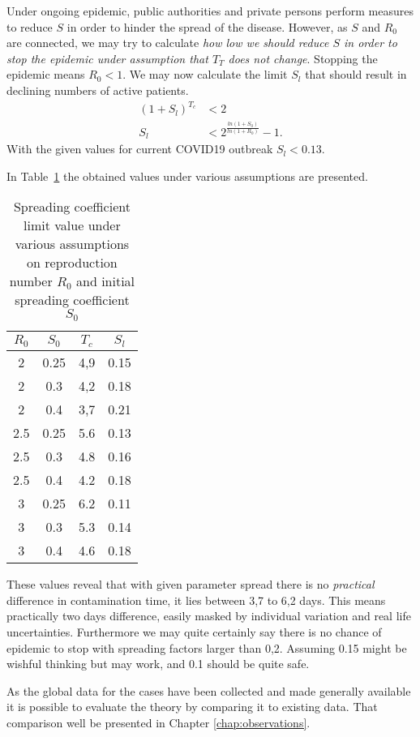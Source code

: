 Under ongoing epidemic, public authorities and private persons perform
measures to reduce $S$ in order to hinder the spread of the disease. However,
as $S$ and $R_0$ are connected, we may try to calculate \emph{how low we should
reduce $S$ in order to stop the epidemic under assumption that $T_T$ does not
change}. Stopping the epidemic means $R_0< 1$. We may now calculate the limit
$S_l$ that should result in declining numbers of active patients.
\begin{align}
    \left(1+S_l\right)^{T_c}&<2\\
    S_l&<2^{\frac{ln\left(1+S_0\right)}{ln\left(1+R_0\right)}}-1.
\end{align}
With the given values for current COVID19 outbreak $S_l<0.13$. 

In Table~\ref{tab:variants} the obtained values under various assumptions are
presented.
\begin{table}[h!]
  \begin{center}
      \caption{Spreading coefficient limit value under various assumptions on
      reproduction number $R_0$ and initial spreading coefficient $S_0$}
    \label{tab:variants}
    \begin{tabular}{c|c|c|c} %
        \textbf{$R_0$} & \textbf{$S_0$} & \textbf{$T_c$} & \textbf{$S_l$}\\
      \hline
      2 &0.25&4,9&0.15 \\
      2 &0.3&4,2&0.18\\
      2 &0.4&3,7&0.21\\
      2.5&0.25&5.6&0.13\\
      2.5&0.3&4.8&0.16\\
      2.5&0.4&4.2&0.18\\
      3 &0.25&6.2&0.11\\
      3 &0.3&5.3&0.14\\
      3 &0.4&4.6&0.18\\
    \end{tabular}
  \end{center}
\end{table}
These values reveal that with given parameter spread there is no
\emph{practical} difference in contamination time, it lies between 3,7 to 6,2
days. This means practically two days difference, easily masked by individual
variation and real life uncertainties. 
Furthermore we may quite
certainly say there is no chance of epidemic to stop with spreading factors
larger than 0,2. Assuming 0.15 might be wishful thinking but may work, and 0.1 should be
quite safe. 

As the global data for the cases have been collected and made generally
available it is possible to evaluate the theory by comparing it to
existing data. That comparison well be presented in Chapter
\ref{chap:observations}.

